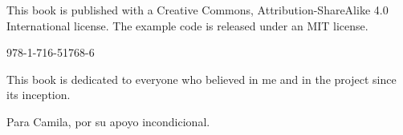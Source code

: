 \vspace{1cm}

\noindent This book is published with a Creative Commons, Attribution-ShareAlike 4.0 International license.\newline
\noindent The example code is released under an MIT license.

\vfill

978-1-716-51768-6

\cleardoublepage

\vspace*{5cm}

\begin{flushright}
    This book is dedicated to everyone who believed in me and in the project since its inception.

    \bigskip

    Para Camila, por su apoyo incondicional.
\end{flushright}

